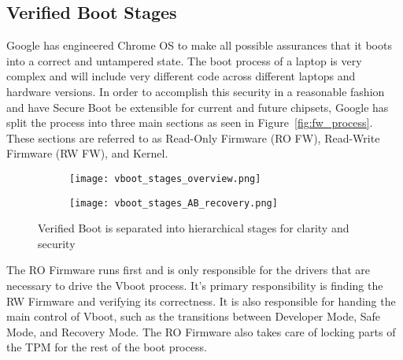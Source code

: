 %


\subsection{Verified Boot Stages}

Google has engineered Chrome OS to make all possible assurances that it boots into a correct and untampered state. 
The boot process of a laptop is very complex and will include very different code across different laptops and hardware versions. 
In order to accomplish this security in a reasonable fashion and have Secure Boot be extensible for current and future chipsets, Google has split the process into three main sections as seen in Figure~\ref{fig:fw_process}.
These sections are referred to as Read-Only Firmware (RO FW), Read-Write Firmware (RW FW), and Kernel.

\begin{figure}
\begin{subfigure}{.4\textwidth}
  \centering
  \texttt{[image: vboot\_stages\_overview.png]}
\end{subfigure}%
\begin{subfigure}{.60\textwidth}
  \centering
  \texttt{[image: vboot\_stages\_AB\_recovery.png]}
\end{subfigure}
\caption{Verified Boot is separated into hierarchical stages for clarity and security}
\label{fig:vboot_stages_overview}
\end{figure}


The RO Firmware runs first and is only responsible for the drivers that are necessary to drive the Vboot process. 
It's primary responsibility is finding the RW Firmware and verifying its correctness. 
It is also responsible for handing the main control of Vboot, such as the transitions between Developer Mode, Safe Mode, and Recovery Mode.
The RO Firmware also takes care of locking parts of the TPM for the rest of the boot process.

